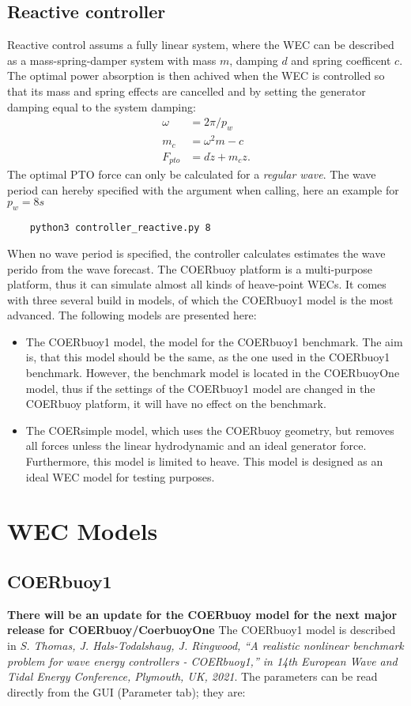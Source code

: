 \documentclass[oneside,10pt,a4paper]{book}
\begin{document}
\subsection{Reactive controller}
Reactive control assums a fully linear system, where the WEC can be described as a mass-spring-damper system with mass $m$, damping $d$ and spring coefficent $c$. The optimal power absorption is then achived when the WEC is controlled so that its mass and spring effects are cancelled and by setting the generator damping equal to the system damping:
\begin{align*}
	\omega&=2\pi/p_w\\
	m_c&=\omega^2 m-c\\
	F_{pto}&=d\dot{z}+m_c z\text{.}
\end{align*}
The optimal PTO force can only be calculated for a \textit{regular wave}. The wave period can hereby specified with the argument when calling, here an example for $p_w=8 s$
\begin{verbatim}
	python3 controller_reactive.py 8
\end{verbatim}
When no wave period is specified, the controller calculates estimates the wave perido from the wave forecast.
The COERbuoy platform is a multi-purpose platform, thus it can simulate almost all kinds of heave-point WECs. It comes with three several build in models, of which the COERbuoy1 model is the most advanced.
The following models are presented here:
\begin{itemize}
	\item The COERbuoy1 model, the model for the COERbuoy1 benchmark. The aim is, that this model should be the same, as the one used in the COERbuoy1 benchmark. However, the benchmark model is located in the COERbuoyOne model, thus if the settings of the COERbuoy1 model are changed in the COERbuoy platform, it will have no effect on the benchmark.
	\item The COERsimple model, which uses the COERbuoy geometry, but removes all forces unless the linear hydrodynamic and an ideal generator force. Furthermore, this model is limited to heave. This model is designed as an ideal WEC model for testing purposes. 
\end{itemize}
\section{WEC Models}
\subsection{COERbuoy1}
\textbf{There will be an update for the COERbuoy model for the next major release for COERbuoy/CoerbuoyOne}
The COERbuoy1 model is described in \textit{S. Thomas, J. Hals-Todalshaug, J. Ringwood, ``A realistic nonlinear benchmark problem for
wave energy controllers - COERbuoy1,'' in 14th European Wave and Tidal Energy Conference,
Plymouth, UK, 2021}. The parameters can be read directly from the GUI (Parameter tab); they are:
\end{document}
